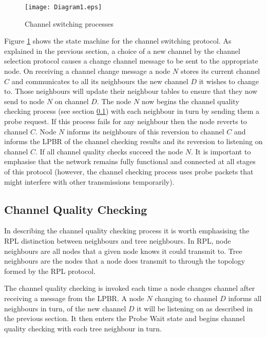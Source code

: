 
\begin{figure}
\centering
\texttt{[image: Diagram1.eps]}
\caption{Channel switching processes}
\label{fig_sim}
\end{figure}

Figure \ref{fig_sim} shows the state machine for the channel switching protocol.
As explained in the previous section, a choice of a new channel by the channel selection protocol causes a change channel message to be sent to the appropriate node. 
On receiving a channel change message a node $N$ stores its current channel $C$ and communicates to all its neighbours the new channel $D$ it wishes to change to.  Those neighbours will update their neighbour tables to ensure that they now send to node $N$ on channel $D$.  The node $N$ now begins the channel quality checking process (see section \ref{sec:channelquality}) with each neighbour in turn by sending them a probe request.  If this process fails for any neighbour then the node reverts to channel $C$.  Node $N$ informs its neighbours of this reversion to channel $C$ and informs the LPBR of the channel checking results and its reversion to listening on channel $C$. If all channel quality checks succeed the node $N$. It is important to emphasise that the network remains fully functional and connected at all stages of this protocol (however, the channel checking process uses probe packets that might interfere with other transmissions temporarily).

\subsection{Channel Quality Checking}
\label{sec:channelquality}

In describing the channel quality checking process it is worth emphasising the RPL distinction between neighbours and tree neighbours. In RPL, node neighbours are all nodes that a given node knows it could transmit to. Tree neighbours are the nodes that a node does transmit to through the topology formed by the RPL protocol.

The channel quality checking is invoked each time a node changes channel after receiving a message from the LPBR. A node $N$ changing to channel $D$ informs all neighbours in turn, of the new channel $D$ it will be listening on as described in the previous section. It then enters the Probe Wait state and begins channel quality checking with each tree neighbour in turn.  

